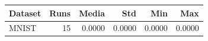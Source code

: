 \begin{tabular}{lrrrrr}
\toprule
Dataset & Runs & Media & Std & Min & Max \\
\midrule
MNIST & 15 & 0.0000 & 0.0000 & 0.0000 & 0.0000 \\
\bottomrule
\end{tabular}